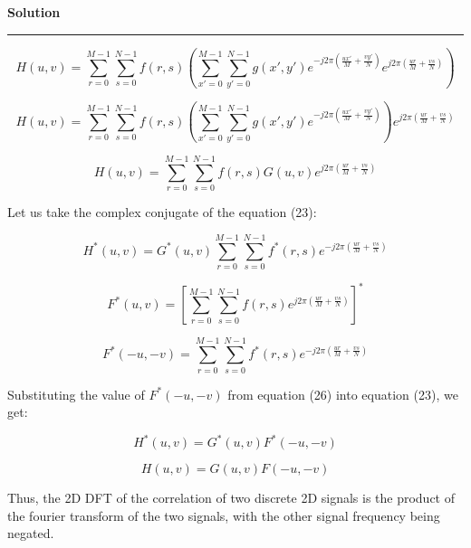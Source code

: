 \documentclass[a4paper]{article}
\newenvironment{solution}[2][]{%
    \begin{mdframed}[linecolor=green!60!black, linewidth=2pt, roundcorner=10pt, backgroundcolor=green!5!white, skipabove=12pt, skipbelow=12pt]%
        \textbf{\large #2} %
        \par\noindent\rule{\textwidth}{0.4pt} %
        \vspace{0.5em} %
}{%
    \end{mdframed}%
}
\begin{document}
\begin{solution}{Solution}
\begin{equation}
    H(u, v) = \sum_{r = 0}^{M-1} \sum_{s = 0}^{N-1} f(r, s)\left( \sum_{x' = 0}^{M-1} \sum_{y' = 0}^{N-1} g(x', y') e^{-j2\pi(\frac{ux'}{M}+\frac{vy'}{N})} e^{j2\pi(\frac{ur}{M}+\frac{vs}{N})}\right)
\end{equation}

\begin{equation}
    H(u, v) = \sum_{r = 0}^{M-1} \sum_{s = 0}^{N-1} f(r, s)\left( \sum_{x' = 0}^{M-1} \sum_{y' = 0}^{N-1} g(x', y') e^{-j2\pi(\frac{ux'}{M}+\frac{vy'}{N})}\right) e^{j2\pi(\frac{ur}{M}+\frac{vs}{N})}
\end{equation}

\begin{equation}
    H(u, v) = \sum_{r = 0}^{M-1} \sum_{s = 0}^{N-1} f(r, s) G(u,v) e^{j2\pi(\frac{ur}{M}+\frac{vs}{N})}
\end{equation}


Let us take the complex conjugate of the equation (23):

\begin{equation}
    H^*(u, v) = G^*(u,v) \sum_{r = 0}^{M-1} \sum_{s = 0}^{N-1} f^*(r, s) e^{-j2\pi(\frac{ur}{M}+\frac{vs}{N})}
\end{equation}

\begin{equation}
    F^*(u, v) = [\sum_{r = 0}^{M-1} \sum_{s = 0}^{N-1} f(r, s)  e^{j2\pi(\frac{ur}{M}+\frac{vs}{N})}]^*
\end{equation}

\begin{equation}
    F^*(-u, -v) = \sum_{r = 0}^{M-1} \sum_{s = 0}^{N-1} f^*(r, s)  e^{-j2\pi(\frac{ur}{M}+\frac{vs}{N})}
\end{equation}

Substituting the value of $F^*(-u, -v)$ from equation (26) into equation (23), we get:

\begin{equation}
    H^*(u, v) = G^*(u,v) F^*(-u, -v)
\end{equation}

\begin{equation}
    H(u, v) = G(u,v) F(-u, -v)
\end{equation}

Thus, the 2D DFT of the correlation of two discrete 2D signals is the product of the fourier transform of the two signals, with the other signal frequency being negated.

\end{solution}
\end{document}
